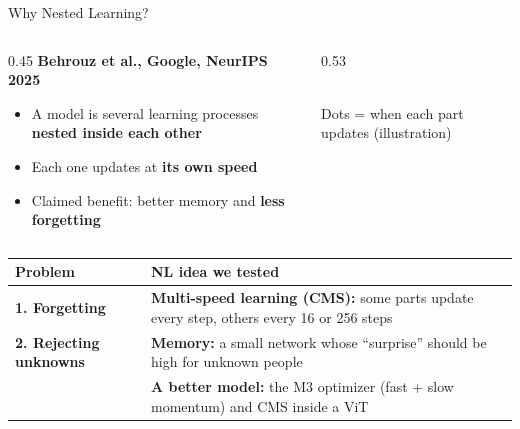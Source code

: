 \documentclass[aspectratio=169,10pt]{beamer}
\begin{document}
\begin{frame}{Why Nested Learning?}
\begin{columns}[T]
\begin{column}{0.45\textwidth}
\textbf{Behrouz et al., Google, NeurIPS 2025}
\begin{itemize}
  \item A model is several learning processes \textbf{nested inside each other}
  \item Each one updates at \textbf{its own speed}
  \item Claimed benefit: better memory and \textbf{less forgetting}
\end{itemize}
\end{column}
\begin{column}{0.53\textwidth}
\centering
{}\\[2pt]
{\scriptsize Dots = when each part updates (illustration)}
\end{column}
\end{columns}

\medskip
\footnotesize
\begin{tabularx}{\textwidth}{@{}lX@{}}
\toprule
\textbf{Problem} & \textbf{NL idea we tested}\\
\midrule
\textbf{1. Forgetting} & \textbf{Multi-speed learning (CMS):} some parts update every step, others every 16 or 256 steps\\
\textbf{2. Rejecting unknowns} & \textbf{Memory:} a small network whose ``surprise'' should be high for unknown people\\
 & \textbf{A better model:} the M3 optimizer (fast + slow momentum) and CMS inside a ViT\\
\bottomrule
\end{tabularx}
\end{frame}
\end{document}
